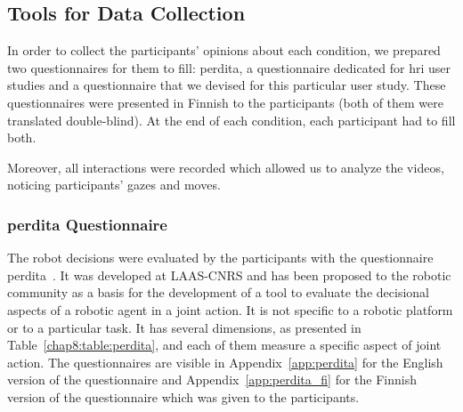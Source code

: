 \documentclass[a4paper,11pt,twoside]{StyleThese}
\begin{document}
\subsection{Tools for Data Collection}

In order to collect the participants' opinions about each condition, we prepared two questionnaires for them to fill: \acrshort{perdita}, a questionnaire dedicated for \acrshort{hri} user studies and a questionnaire that we devised for this particular user study. These questionnaires were presented in Finnish to the participants (both of them were translated double-blind). At the end of each condition, each participant had to fill both.

Moreover, all interactions were recorded which allowed us to analyze the videos, noticing participants' gazes and moves.

\subsubsection{\acrshort{perdita} Questionnaire}

The robot decisions were evaluated by the participants with the questionnaire \acrfull{perdita}~\citep{devin_2018_evaluating}. It was developed at LAAS-CNRS and has been proposed to the robotic community as a basis for the development of a tool to evaluate the decisional aspects of a robotic agent in a joint action. It is not specific to a robotic platform or to a particular task. It has several dimensions, as presented in Table~\ref{chap8:table:perdita}, and each of them measure a specific aspect of joint action. The questionnaires are visible in Appendix~\ref{app:perdita} for the English version of the questionnaire and Appendix~\ref{app:perdita_fi} for the Finnish version of the questionnaire which was given to the participants.
\end{document}
